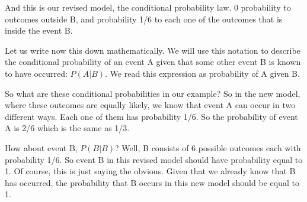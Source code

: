 \documentclass[pdftex, brazil, 12pt, twoside]{article}
\begin{document}
\begin{figure}[H]
  \begin{center}
  \end{center}
\end{figure}

And this is our revised model, the
conditional probability law.
0 probability to outcomes outside B, and probability 1/6
to each one of the outcomes that is inside the event B.

Let us write now this down mathematically.
We will use this notation to describe the conditional
probability of an event A given that some other event B
is known to have occurred: $P(A | B)$.
We read this expression as probability of A given B.

So
what are these conditional probabilities in our example?
So in the new model, where these outcomes are equally
likely, we know that event A can occur in
two different ways.
Each one of them has probability 1/6.
So the probability of event A is 2/6 which
is the same as 1/3.

How about event B, $P(B | B)$? Well, B consists of 6 possible
outcomes each with probability 1/6.
So event B in this revised model should have probability
equal to 1.
Of course, this is just saying the obvious.
Given that we already know that B has occurred, the
probability that B occurs in this new model
should be equal to 1.

\begin{figure}[H]
  \begin{center}
  \end{center}
\end{figure}
\end{document}
